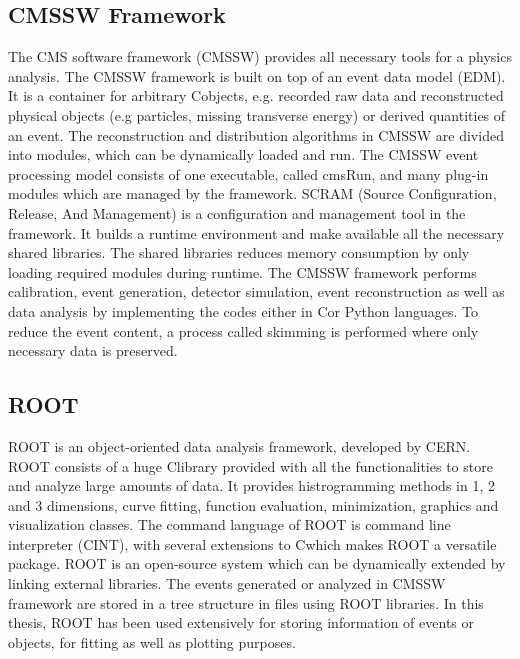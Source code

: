 \subsection{CMSSW Framework}
The CMS software framework (CMSSW) \cite{CMS:2005aa} provides all necessary tools for a physics analysis. The CMSSW framework is built on top of an event data model (EDM). It is a container for arbitrary C\plusn\plus objects, e.g. recorded raw data and reconstructed physical objects (e.g particles, missing transverse energy) or derived quantities of an event. The reconstruction and distribution algorithms in CMSSW are divided into modules, which can be dynamically loaded and run. The CMSSW event processing model consists of one executable, called cmsRun, and many plug-in modules which are managed by the framework. SCRAM (Source Configuration, Release, And Management) is a configuration and management tool in the framework. It builds a runtime environment and make available all the necessary shared libraries. The shared libraries reduces memory consumption by only loading required modules during runtime. The CMSSW framework performs calibration, event generation, detector simulation, event reconstruction as well as data analysis by implementing the codes either in C\plusn\plus or Python languages. To reduce the event content, a process called skimming is performed where only necessary data is preserved. 

\subsection{ROOT}
ROOT \cite{Brun:1997pa} is an object-oriented data analysis framework, developed by CERN. ROOT consists of a huge C\plusn\plus library provided with all the functionalities to store and analyze large amounts of data. It provides histrogramming methods in 1, 2 and 3 dimensions, curve fitting, function evaluation, minimization, graphics and visualization classes. The command language of ROOT is command line interpreter (CINT), with several extensions to C\plusn\plus which makes ROOT a versatile package. ROOT is an open-source system which can be dynamically extended by linking external libraries. The events generated or analyzed in CMSSW framework are stored in a tree structure in files using ROOT libraries. In this thesis, ROOT has been used extensively for storing information of events or objects, for fitting as well as plotting purposes.

